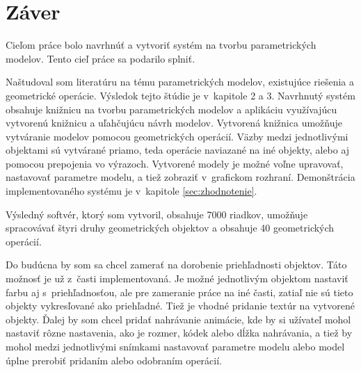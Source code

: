 \chapter{Záver}
Cieľom práce bolo navrhnúť a vytvoriť systém na tvorbu parametrických modelov. Tento cieľ práce sa podarilo splniť. 


Naštudoval som literatúru na tému parametrických modelov, existujúce riešenia a geometrické operácie. Výsledok tejto štúdie je v~kapitole 2 a 3. 
Navrhnutý systém obsahuje knižnicu na tvorbu parametrických modelov a aplikáciu využívajúcu vytvorenú knižnicu a uľahčujúcu návrh modelov.
Vytvorená knižnica umožňuje vytváranie modelov pomocou geometrických operácií. Väzby medzi jednotlivými objektami sú vytvárané  priamo, teda operácie naviazané na iné objekty, alebo aj pomocou prepojenia vo výrazoch. Vytvorené modely je možné voľne upravovať, nastavovať parametre modelu, a tiež zobraziť v~grafickom rozhraní. Demonštrácia implementovaného systému je v~kapitole \ref{sec:zhodnotenie}.

Výsledný softvér, ktorý som vytvoril, obsahuje 7000 riadkov, umožňuje spracovávať štyri druhy geometrických objektov a obsahuje 40 geometrických operácií. 

Do budúcna by som sa chcel zamerať na dorobenie priehľadnosti objektov. Táto možnosť je už z~časti implementovaná. Je možné jednotlivým objektom nastaviť farbu aj s~priehľadnosťou, ale pre zameranie práce na iné časti, zatiaľ nie sú tieto objekty vykresľované ako priehľadné.
Tiež je vhodné pridanie textúr na vytvorené objekty.
Ďalej by som chcel pridať nahrávanie animácie, kde by si užívateľ mohol nastaviť rôzne nastavenia, ako je rozmer, kódek alebo dĺžka nahrávania, a tiež by mohol medzi jednotlivými snímkami nastavovať parametre modelu alebo model úplne prerobiť pridaním alebo odobraním operácií.  












